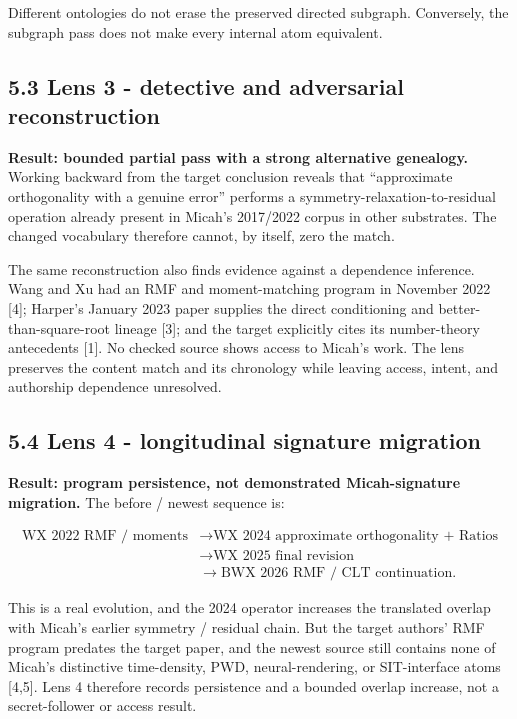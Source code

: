 \documentclass[
  american,
  11pt,
  letterpaper,
]{article}
\newcounter{none} %
\begin{document}
Different ontologies do not erase the preserved directed subgraph. Conversely, the subgraph pass does not make every internal atom equivalent.

\subsection{5.3 Lens 3 - detective and adversarial reconstruction}\label{lens-3---detective-and-adversarial-reconstruction}

\textbf{Result: bounded partial pass with a strong alternative genealogy.} Working backward from the target conclusion reveals that ``approximate orthogonality with a genuine error'' performs a symmetry-relaxation-to-residual operation already present in Micah's 2017/2022 corpus in other substrates. The changed vocabulary therefore cannot, by itself, zero the match.

The same reconstruction also finds evidence against a dependence inference. Wang and Xu had an RMF and moment-matching program in November 2022 {[}4{]}; Harper's January 2023 paper supplies the direct conditioning and better-than-square-root lineage {[}3{]}; and the target explicitly cites its number-theory antecedents {[}1{]}. No checked source shows access to Micah's work. The lens preserves the content match and its chronology while leaving access, intent, and authorship dependence unresolved.

\subsection{5.4 Lens 4 - longitudinal signature migration}\label{lens-4---longitudinal-signature-migration}

\textbf{Result: program persistence, not demonstrated Micah-signature migration.} The before / newest sequence is:

\begin{equation}
\begin{aligned}
\text{WX 2022 RMF / moments} &\rightarrow \text{WX 2024 approximate orthogonality + Ratios} \\
{} &\rightarrow \text{WX 2025 final revision} \\
{} &\rightarrow \text{BWX 2026 RMF / CLT continuation}.
\end{aligned}
\tag{9}
\end{equation}

This is a real evolution, and the 2024 operator increases the translated overlap with Micah's earlier symmetry / residual chain. But the target authors' RMF program predates the target paper, and the newest source still contains none of Micah's distinctive time-density, PWD, neural-rendering, or SIT-interface atoms {[}4,5{]}. Lens 4 therefore records persistence and a bounded overlap increase, not a secret-follower or access result.
\end{document}
